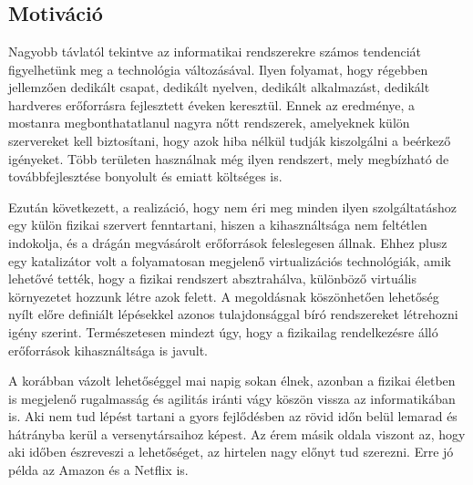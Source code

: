 \chapter{\bevezetes}

\section{Motiváció}

Nagyobb távlatól tekintve az informatikai rendszerekre számos tendenciát figyelhetünk meg a technológia változásával.
Ilyen folyamat, hogy régebben jellemzően dedikált csapat, dedikált nyelven, dedikált alkalmazást, dedikált hardveres erőforrásra fejlesztett éveken keresztül. 
Ennek az eredménye, a mostanra megbonthatatlanul nagyra nőtt rendszerek, amelyeknek külön szervereket kell biztosítani, hogy azok hiba nélkül tudják kiszolgálni a beérkező igényeket.
Több területen használnak még ilyen rendszert, mely megbízható de továbbfejlesztése bonyolult és emiatt költséges is.

Ezután következett, a realizáció, hogy nem éri meg minden ilyen szolgáltatáshoz egy külön fizikai szervert fenntartani, hiszen a kihasználtsága nem feltétlen indokolja, és a drágán megvásárolt erőforrások feleslegesen állnak.
Ehhez plusz egy katalizátor volt a folyamatosan megjelenő virtualizációs technológiák, amik lehetővé tették, hogy a fizikai rendszert absztrahálva, különböző virtuális környezetet hozzunk létre azok felett.
A megoldásnak köszönhetően lehetőség nyílt előre definiált lépésekkel azonos tulajdonsággal bíró rendszereket létrehozni igény szerint. Természetesen mindezt úgy, hogy a fizikailag rendelkezésre álló erőforrások kihasználtsága is javult.

A korábban vázolt lehetőséggel mai napig sokan élnek, azonban a fizikai életben is megjelenő rugalmasság és agilitás iránti vágy köszön vissza az informatikában is. Aki nem tud lépést tartani a gyors fejlődésben az rövid időn belül lemarad és hátrányba kerül a versenytársaihoz képest. Az érem másik oldala viszont az, hogy aki időben észreveszi a lehetőséget, az hirtelen nagy előnyt tud szerezni. Erre jó példa az Amazon\citep{amazon} és a Netflix\citep{netflix} is.  


